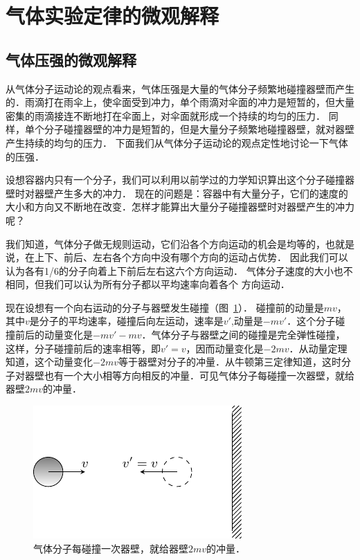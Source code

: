 \section{气体实验定律的微观解释}
\subsection{气体压强的微观解释} 
从气体分子运动论的观点看来，气体压强是大量的气体分子频繁地碰撞器壁而产生的．雨滴打在雨伞上，使伞面受到冲力，单个雨滴对伞面的冲力是短暂的，但大量密集的雨滴接连不断地打在伞面上，对伞面就形成一个持续的均匀的压力．
同样，单个分子碰撞器壁的冲力是短暂的，但是大量分子频繁地碰撞器壁，就对器壁产生持续的均匀的压力．
下面我们从气体分子运动论的观点定性地讨论一下气体的压强．

设想容器内只有一个分子，我们可以利用以前学过的力学知识算出这个分子碰撞器壁时对器壁产生多大的冲力．
现在的问题是：容器中有大量分子，它们的速度的大小和方向又不断地在改变．怎样才能算出大量分子碰撞器壁时对器壁产生的冲力呢？

我们知道，气体分子做无规则运动，它们沿各个方向运动的机会是均等的，也就是说，在上下、前后、左右各个方向中没有哪个方向的运动占优势．
因此我们可以认为各有1/6的分子向着上下前后左右这六个方向运动．
气体分子速度的大小也不相同，但我们可以认为所有分子都以平均速率向着各个
方向运动．



现在设想有一个向右运动的分子与器壁发生碰撞（图~\ref{fig_B_3-14}）．
碰撞前的动量是$mv$，其中$v$是分子的平均速率，碰撞后向左运动，速率是$v'$,动量是$-mv'$．这个分子碰撞前后的动量变化是$-mv'-mv$．气体分子与器壁之间的碰撞是完全弹性碰撞，这样，分子碰撞前后的速率相等，即$v'=v$，因而动量变化是$-2mv$．从动量定理知道，这个动量变化$-2mv$等于器壁对分子的冲量．从牛顿第三定律知道，这时分子对器壁也有一个大小相等方向相反的冲量．可见气体分子每碰撞一次器壁，就给器壁$2mv$的冲量．

\begin{figure}[htbp]
	\centering
	\includegraphics{fig/B/3-14.pdf}
	\caption{气体分子每碰撞一次器壁，就给器壁$2mv$的冲量．}\label{fig_B_3-14}
\end{figure}



